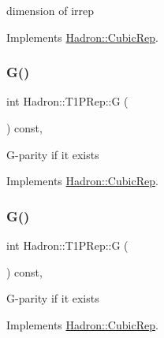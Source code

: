 dimension of irrep 

Implements \mbox{\hyperlink{structHadron_1_1CubicRep_ac178d14064f037a66af4b9fb4b312d51}{Hadron\+::\+Cubic\+Rep}}.

\mbox{\label{structHadron_1_1T1PRep_ab9f492c9418a9100a8c3cef867831758}} 
\subsubsection{\texorpdfstring{G()}{G()}\hspace{0.1cm}{\footnotesize\ttfamily [1/2]}}
{\footnotesize\ttfamily int Hadron\+::\+T1\+P\+Rep\+::G (\begin{DoxyParamCaption}{ }\end{DoxyParamCaption}) const\hspace{0.3cm}{\ttfamily [inline]}, {\ttfamily [virtual]}}

G-\/parity if it exists 

Implements \mbox{\hyperlink{structHadron_1_1CubicRep_a52104e43266d1614c00bbd1c3b395458}{Hadron\+::\+Cubic\+Rep}}.

\mbox{\label{structHadron_1_1T1PRep_ab9f492c9418a9100a8c3cef867831758}} 
\subsubsection{\texorpdfstring{G()}{G()}\hspace{0.1cm}{\footnotesize\ttfamily [2/2]}}
{\footnotesize\ttfamily int Hadron\+::\+T1\+P\+Rep\+::G (\begin{DoxyParamCaption}{ }\end{DoxyParamCaption}) const\hspace{0.3cm}{\ttfamily [inline]}, {\ttfamily [virtual]}}

G-\/parity if it exists 

Implements \mbox{\hyperlink{structHadron_1_1CubicRep_a52104e43266d1614c00bbd1c3b395458}{Hadron\+::\+Cubic\+Rep}}.

\mbox{\label{structHadron_1_1T1PRep_a9e319545acc323df42a4668547bac994}} 

